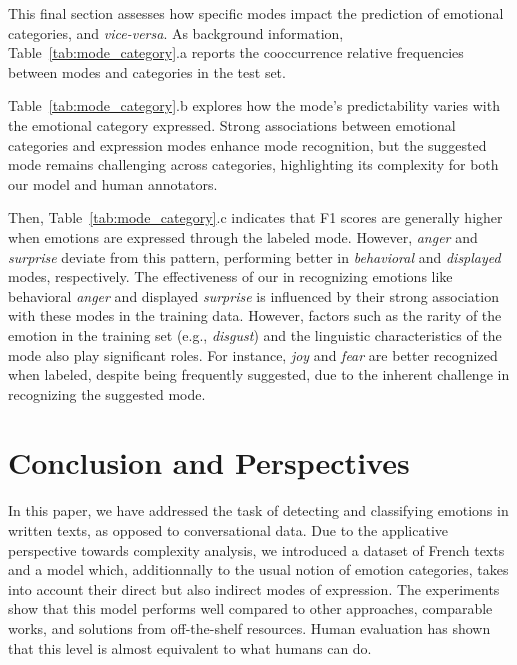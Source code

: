 This final section assesses how specific modes impact the prediction of emotional categories, and \textit{vice-versa}. As background information, {Table~\ref{tab:mode_category}.a} reports the cooccurrence relative frequencies between modes and categories in the test set.


Table~\ref{tab:mode_category}.b explores how the mode's predictability varies with the emotional category expressed. Strong associations between emotional categories and expression modes enhance mode recognition, but the suggested mode remains challenging across categories, highlighting its complexity for both our model and human annotators.

Then, Table~\ref{tab:mode_category}.c indicates that F1 scores are generally higher when emotions are expressed through the labeled mode. However, \textit{anger} and \textit{surprise} deviate from this pattern, performing better in \textit{behavioral} and \textit{displayed} modes, respectively.
%
The effectiveness of our in recognizing emotions like behavioral \textit{anger} and displayed \textit{surprise} is influenced by their strong association with these modes in the training data. However, factors such as the rarity of the emotion in the training set (e.g., \textit{disgust}) and the linguistic characteristics of the mode also play significant roles. For instance, \textit{joy} and \textit{fear} are better recognized when labeled, despite being frequently suggested, due to the inherent challenge in recognizing the suggested mode. 


\section{Conclusion and Perspectives}

In this paper, we have addressed the task of detecting and classifying emotions in written texts, as opposed to conversational data. Due to the applicative perspective towards complexity analysis, we introduced a dataset of French texts and a model which, additionnally to the usual notion of emotion categories, takes into account their direct but also indirect modes of expression.
%
The experiments show that this model performs well compared to other approaches, comparable works, and solutions from off-the-shelf resources. Human evaluation has shown that this level is almost equivalent to what humans can do.

